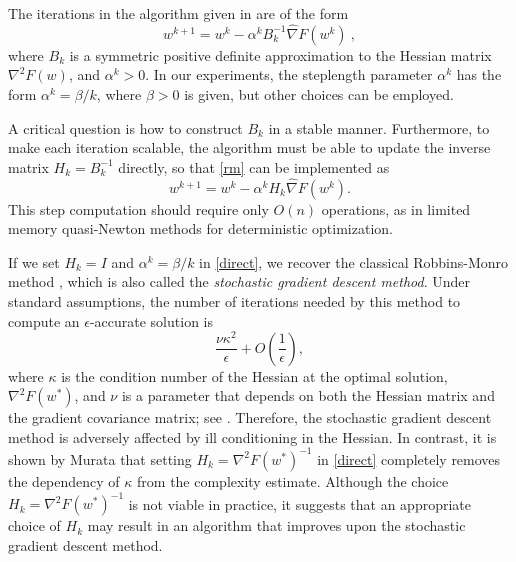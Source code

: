 \documentclass[12pt]{article}
\newcommand{\bg}{\widehat{\nabla}F}
\begin{document}
The iterations in the algorithm given in \cite{sammy} are of the form
\begin{equation}   \label{rm}
   w^{k+1} = w^k - \alpha^k B_k^{-1} \bg(w^k) ~,
\end{equation}
where $B_k$ is a symmetric positive definite approximation to the Hessian
matrix $\nabla^2 F(w)$, and $\alpha^k>0$.  In our experiments, the steplength
parameter $\alpha^k$ has the form $\alpha^k = \beta/k$, where $\beta >0$ is
given, but other choices can be employed.
 


A critical question is how to construct $B_k$ in a stable manner. Furthermore, to make each iteration scalable, the algorithm must be able to update the inverse matrix $H_k= B_k^{-1}$ directly, so that \eqref{rm} can be implemented as
\begin{equation}   \label{direct}
        w^{k+1} = w^k - \alpha^k H_k \bg(w^k) .
 \end{equation}
 This step computation should require only $O(n)$ operations, as in limited memory quasi-Newton methods for deterministic optimization. 

If we set $H_k=I$ and $\alpha^k= \beta/k$ in \eqref{direct}, we recover the classical Robbins-Monro method \cite{RobMon51}, which is also called the \emph{stochastic gradient descent method}. Under standard assumptions, the number of iterations needed by this method to compute an $\epsilon$-accurate solution is 
\[
      \frac{\nu\kappa^2}{\epsilon} + O\left(\frac{1}{\epsilon}\right) ,
 \] 
 where $\kappa$ is the condition number of the Hessian at the optimal solution, $\nabla^2 F(w^*)$, and $\nu$ is a parameter that depends on both the Hessian matrix and the gradient covariance matrix; see \cite{murata1998statistical,BottouBosq08}. Therefore, the stochastic gradient descent method is adversely affected by ill conditioning in the Hessian. In contrast, it is shown by Murata \cite{murata1998statistical} that setting $H_k=\nabla^2F(w^*)^{-1}$ in \eqref{direct}
completely removes the dependency of $\kappa$ from the complexity estimate. %
Although the choice $H_k=\nabla^2 F(w^*)^{-1}$ is not viable in practice, it suggests that an appropriate choice of $H_k$ may result in an algorithm that improves upon the stochastic gradient descent method.
\end{document}
